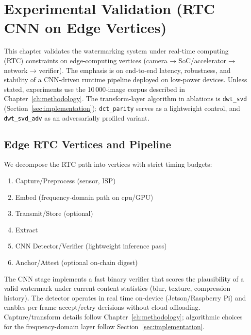 \chapter{Experimental Validation (RTC CNN on Edge Vertices)}
\label{ch:exp}

\providecommand{\detInferMeanMsJetson}{--}
\providecommand{\detInferMeanMsPi}{--}
\providecommand{\embedMeanMs}{--}
\providecommand{\embedSdMs}{--}
\providecommand{\extractMeanMs}{--}
\providecommand{\extractSdMs}{--}
\providecommand{\accJPEGtwenty}{--}
\providecommand{\accJPEGseventy}{--}
\providecommand{\accJPEGninety}{--}
\providecommand{\confirmMedian}{--}
\providecommand{\confirmPninety}{--}
\providecommand{\confirmPctAdd}{--}
\providecommand{\defaultseed}{0}

This chapter validates the watermarking system under real-time computing (RTC) constraints on edge-computing vertices (camera → SoC/accelerator → network → verifier). The emphasis is on end-to-end latency, robustness, and stability of a CNN-driven runtime pipeline deployed on low-power devices. Unless stated, experiments use the 10\,000-image corpus described in Chapter~\ref{ch:methodology}. The transform-layer algorithm in ablations is \texttt{dwt\_svd} (Section~\ref{sec:implementation}); \texttt{dct\_parity} serves as a lightweight control, and \texttt{dwt\_svd\_adv} as an adversarially profiled variant.

\section{Edge RTC Vertices and Pipeline}
\label{sec:validation:pipeline}

We decompose the RTC path into vertices with strict timing budgets:
\begin{enumerate}
    \item Capture/Preprocess (sensor, ISP)
    \item Embed (frequency-domain path on \gls{cpu}/GPU)
    \item Transmit/Store (optional)
    \item Extract
    \item CNN Detector/Verifier (lightweight inference pass)
    \item Anchor/Attest (optional on-chain digest)
\end{enumerate}

The CNN stage implements a fast binary verifier that scores the plausibility of a valid watermark under current content statistics (blur, texture, compression history). The detector operates in real time on-device (Jetson/Raspberry Pi) and enables per-frame accept/retry decisions without cloud offloading. Capture/transform details follow Chapter~\ref{ch:methodology}; algorithmic choices for the frequency-domain layer follow Section~\ref{sec:implementation}.

